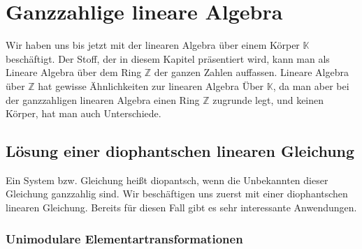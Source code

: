 \documentclass[
a4paper,landscape,16pt,
bibliography=totocnumbered,
numbers=noenddot,
]{scrartcl}
\numberwithin{equation}{subsection}
\newcommand{\Z}{\mathbb Z}
\newcommand{\K}{\mathbb K}
\theoremstyle{plain}
\theoremstyle{definition}
\begin{document}
\section{Ganzzahlige lineare Algebra} 

Wir haben uns bis jetzt mit der linearen Algebra über einem Körper $\K$ beschäftigt. Der Stoff, der in diesem Kapitel präsentiert wird, kann man als Lineare Algebra über dem Ring $\Z$ der ganzen Zahlen auffassen. Lineare Algebra über $\Z$ hat gewisse Ähnlichkeiten zur linearen Algebra Über $\K$, da man aber  bei der ganzzahligen linearen Algebra einen Ring $\Z$ zugrunde legt, und keinen Körper, hat man auch Unterschiede.

\subsection{Lösung einer diophantschen linearen Gleichung} 

Ein System bzw. Gleichung heißt diopantsch, wenn die Unbekannten dieser Gleichung ganzzahlig sind. Wir beschäftigen uns zuerst mit einer diophantschen linearen Gleichung. Bereits für diesen Fall gibt es sehr interessante Anwendungen. 

\subsubsection{Unimodulare  Elementartransformationen}
\end{document}
